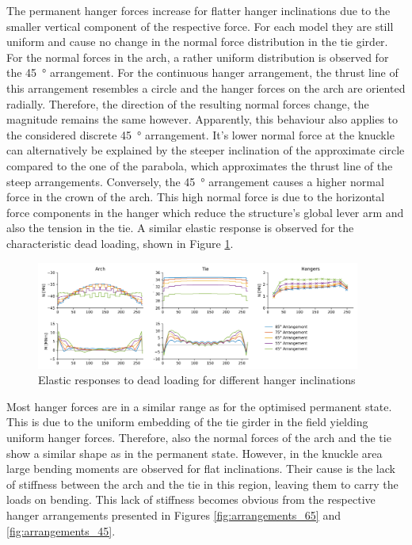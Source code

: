The permanent hanger forces increase for flatter hanger inclinations due to the smaller vertical component of the respective force. For each model they are still uniform and cause no change in the normal force distribution in the tie girder. For the normal forces in the arch, a rather uniform distribution is observed for the \SI{45}{\degree} arrangement. For the continuous hanger arrangement, the thrust line of this arrangement resembles a circle and the hanger forces on the arch are oriented radially. Therefore, the direction of the resulting normal forces change, the magnitude remains the same however. Apparently, this behaviour also applies to the considered discrete \SI{45}{\degree} arrangement. It's lower normal force at the knuckle can alternatively be explained by the steeper inclination of the approximate circle compared to the one of the parabola, which approximates the thrust line of the steep arrangements. Conversely, the \SI{45}{\degree} arrangement causes a higher normal force in the crown of the arch. This high normal force is due to the horizontal force components in the hanger which reduce the structure's global lever arm and also the tension in the tie. 
A similar elastic response is observed for the characteristic dead loading, shown in Figure \ref{fig:inclination_dead}.
\begin{figure}[H]
    \centering
    \includegraphics[width=0.95\textwidth]{calculations/parallel arrangement comparison/dead load_plot.png}
    \caption{Elastic responses to dead loading for different hanger inclinations}
    \label{fig:inclination_dead}
\end{figure}

Most hanger forces are in a similar range as for the optimised permanent state. This is due to the uniform embedding of the tie girder in the field yielding uniform hanger forces. Therefore, also the normal forces of the arch and the tie show a similar shape as in the permanent state. However, in the knuckle area large bending moments are observed for flat inclinations. Their cause is the lack of stiffness between the arch and the tie in this region, leaving them to carry the loads on bending. This lack of stiffness becomes obvious from the respective hanger arrangements presented in Figures \ref{fig:arrangements_65} and \ref{fig:arrangements_45}.


